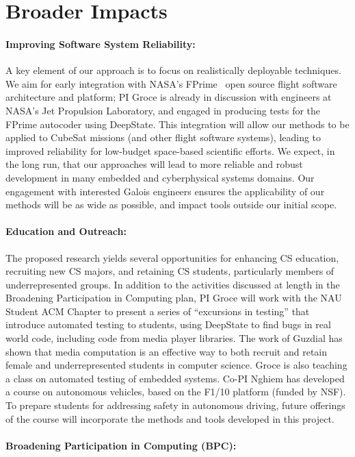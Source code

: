 \section{Broader Impacts}

\paragraph{Improving Software System Reliability:} A key element of
our approach is to focus on realistically deployable techniques.  We aim
for early integration with NASA's FPrime~\cite{fprime,fprimerepo}
open source
flight software architecture and platform; PI Groce is already in
discussion with engineers at NASA's Jet Propulsion Laboratory, and
engaged in producing tests for the FPrime autocoder using DeepState.
This integration will allow our
methods to be applied to CubeSat missions (and other flight software
systems), leading to improved reliability for low-budget space-based
scientific efforts.  We expect, in the long run, that our approaches
will lead to more reliable and robust development in many embedded and
cyberphysical systems domains.  Our engagement with interested Galois
engineers ensures the applicability of our methods will be as wide as
possible, and impact tools outside our initial scope.

\paragraph{Education and Outreach:}
The proposed research yields several opportunities for enhancing CS
education, recruiting new CS majors, and retaining CS students,
particularly members of underrepresented groups.  In addition to the
activities discussed at length in the Broadening Participation in
Computing plan, PI Groce will work with the NAU Student ACM Chapter to
present a series of ``excursions in testing'' that introduce automated
testing to students, using DeepState to find bugs in real world code,
including code from media player libraries.  The
work of Guzdial \cite{Guzdial} has shown that media computation is an effective way to both recruit and retain female and
underrepresented students in computer science. Groce is also teaching
a class on automated testing of embedded systems.  Co-PI Nghiem has
developed a course on  autonomous vehicles, based on the F1/10 platform (funded by
NSF). %
To prepare students for addressing safety in autonomous driving, future offerings of the course will incorporate the methods and tools developed in this project.


\paragraph{Broadening Participation in Computing (BPC):}


